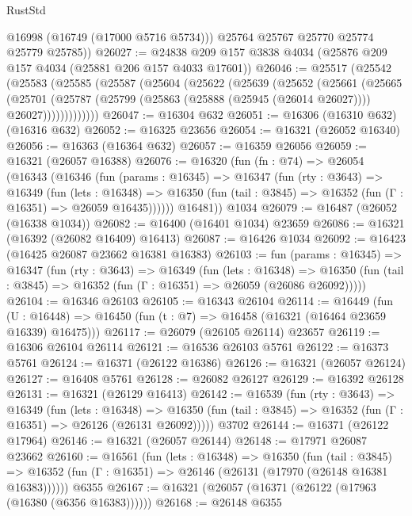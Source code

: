 \begin{lexlean}{RustStd}
\begin{coremodule}
          @16998
          (@16749 (@17000 @5716 @5734)))
        @25764
        @25767
        @25770
        @25774
        @25779
        @25785))
@26027 := @24838 @209 @157 @3838 @4034 (@25876 @209 @157 @4034 (@25881 @206 @157 @4033 @17601))
@26046 := @25517
    (@25542
      (@25583
        (@25585
          (@25587
            (@25604
              (@25622
                (@25639
                  (@25652
                    (@25661
                      (@25665
                        (@25701
                          (@25787
                            (@25799 (@25863 (@25888 (@25945 (@26014 @26027)))) @26027)))))))))))))
@26047 := @16304 @632
@26051 := @16306 (@16310 @632) (@16316 @632)
@26052 := @16325 @23656
@26054 := @16321 (@26052 @16340)
@26056 := @16363 (@16364 @632)
@26057 := @16359 @26056
@26059 := @16321 (@26057 @16388)
@26076 := @16320
    (fun (fn : @74) =>
    @26054
      (@16343
        (@16346
          (fun (params : @16345) =>
          @16347
            (fun (rty : @3643) =>
            @16349
              (fun (lets : @16348) =>
              @16350 (fun (tail : @3845) => @16352 (fun (Γ : @16351) => @26059 @16435))))))
        @16481))
    @1034
@26079 := @16487 (@26052 (@16338 @1034))
@26082 := @16400 (@16401 @1034) @23659
@26086 := @16321 (@16392 (@26082 @16409) @16413)
@26087 := @16426 @1034
@26092 := @16423 (@16425 @26087 @23662 @16381 @16383)
@26103 := fun (params : @16345) =>
  @16347
    (fun (rty : @3643) =>
    @16349
      (fun (lets : @16348) =>
      @16350 (fun (tail : @3845) => @16352 (fun (Γ : @16351) => @26059 (@26086 @26092)))))
@26104 := @16346 @26103
@26105 := @16343 @26104
@26114 := @16449
    (fun (U : @16448) => @16450 (fun (t : @7) => @16458 (@16321 (@16464 @23659 @16339) @16475)))
@26117 := @26079 (@26105 @26114) @23657
@26119 := @16306 @26104 @26114
@26121 := @16536 @26103 @5761
@26122 := @16373 @5761
@26124 := @16371 (@26122 @16386)
@26126 := @16321 (@26057 @26124)
@26127 := @16408 @5761
@26128 := @26082 @26127
@26129 := @16392 @26128
@26131 := @16321 (@26129 @16413)
@26142 := @16539
    (fun (rty : @3643) =>
    @16349
      (fun (lets : @16348) =>
      @16350 (fun (tail : @3845) => @16352 (fun (Γ : @16351) => @26126 (@26131 @26092)))))
    @3702
@26144 := @16371 (@26122 @17964)
@26146 := @16321 (@26057 @26144)
@26148 := @17971 @26087 @23662
@26160 := @16561
    (fun (lets : @16348) =>
    @16350
      (fun (tail : @3845) =>
      @16352 (fun (Γ : @16351) => @26146 (@26131 (@17970 (@26148 @16381 @16383))))))
    @6355
@26167 := @16321 (@26057 (@16371 (@26122 (@17963 (@16380 (@6356 @16383))))))
@26168 := @26148 @6355

\end{coremodule}
\end{lexlean}
